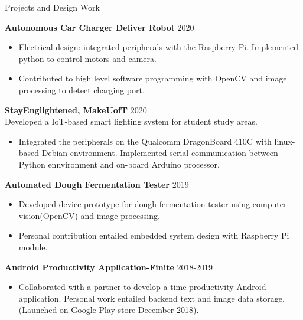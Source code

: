 \documentclass{my_resume} %
\begin{document}
\hspace{0.04\textwidth}
\begin{minipage}[t]{0.66\textwidth} 




    \begin{rSection}{Projects and Design Work}    
 
        \textbf{Autonomous Car Charger Deliver Robot} \hfill{2020}
        \begin{itemize}
            \item Electrical design: integrated peripherals with the Raspberry Pi. Implemented python to control motors and camera. 
            \item Contributed to high level software programming with OpenCV and image processing  to detect charging port. 
        \end{itemize}

        \vspace{5pt} 
        \textbf{StayEnglightened, MakeUofT} \hfill{2020}\\
       Developed a IoT-based smart lighting system for student study areas.
            \begin{itemize}
                \item Integrated the peripherals on the Qualcomm DragonBoard 410C with linux-based Debian environment. Implemented serial communication between Python ennvironment and on-board Arduino processor.
            \end{itemize} 
        
        \vspace{5pt} 
        \textbf{Automated Dough Fermentation Tester} \hfill{2019}
        \begin{itemize}
            \item Developed device prototype for dough fermentation tester using computer vision(OpenCV) and image processing. 
            \item Personal contribution entailed embedded system design with Raspberry Pi module. 
        \end{itemize}
            
        \vspace{5pt} 
        \textbf{Android Productivity Application-Finite} \hfill{2018-2019} 
        \begin{itemize}
            \item Collaborated with a partner to develop a time-productivity Android application. Personal work entailed backend text and image data storage. (Launched on Google Play store December 2018).
            

\end{itemize}
\end{rSection}
\end{minipage}
\end{document}
